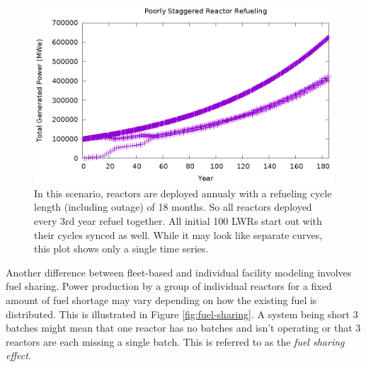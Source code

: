 \documentclass{style}
\begin{document}
\begin{figure}[h]
    \centering
    \includegraphics[width=1.0\columnwidth]{exp2/sync-cycle.eps}
    \caption[The cycle staggering effect]{
        In this scenario, reactors are deployed annualy with a refueling cycle
        length (including outage) of 18 months.  So all reactors deployed
        every 3rd year refuel together.  All initial 100 LWRs start out with
        their cycles synced as well.  While it may look like separate curves,
        this plot shows only a single time series.
    }
    \label{fig:sync-cycle}
\end{figure}

Another difference between fleet-based and individual facility modeling
involves fuel sharing.  Power production by a group of individual reactors for
a fixed amount of fuel shortage may vary depending on how the existing fuel is
distributed.  This is illustrated in Figure \ref{fig:fuel-sharing}.  A system
being short 3 batches might mean that one reactor has no batches and isn't
operating or that 3 reactors are each missing a single batch.  This is
referred to as the \emph{fuel sharing effect}.
\end{document}
